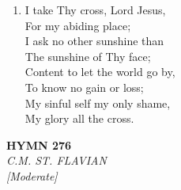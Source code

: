 \documentclass[11pt,a4paper]{article}
\begin{document}
\begin{enumerate}
    \item I take Thy cross, Lord Jesus, \\
        For my abiding place; \\
        I ask no other sunshine than \\
        The sunshine of Thy face; \\
        Content to let the world go by, \\
        To know no gain or loss; \\
        My sinful self my only shame, \\
        My glory all the cross.

\end{enumerate}

\newpage
\begin{center}
    {\Large \textbf{HYMN 276}}
    \\
    \textit{C.M. ST. FLAVIAN}
    \\
    \textit{\small [Moderate]}
\end{center}
\vspace{1em}
\end{document}
